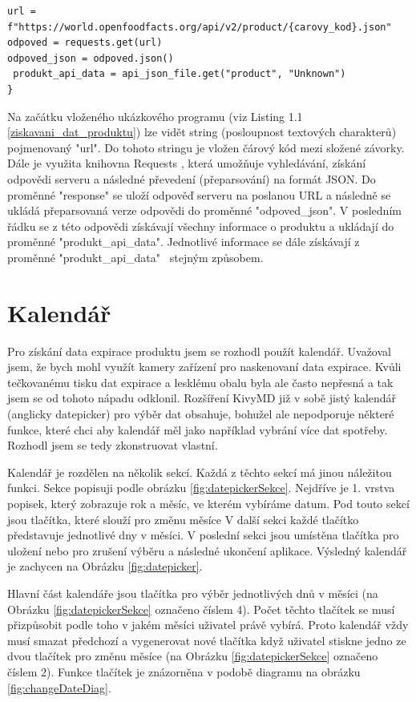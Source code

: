 \documentclass[12pt, a4paper, oneside]{report}
\begin{document}
\begin{lstlisting}[style=python,label=ziskavani_dat_produktu,caption=Ukázka získání JSON souboru produktu]
url = f"https://world.openfoodfacts.org/api/v2/product/{carovy_kod}.json"
odpoved = requests.get(url)
odpoved_json = odpoved.json()
 produkt_api_data = api_json_file.get("product", "Unknown")
}
\end{lstlisting}
Na začátku vloženého ukázkového programu (viz Listing 1.1 \ref{ziskavani_dat_produktu}) lze vidět string (posloupnost textových charakterů) pojmenovaný "url". Do tohoto stringu je vložen čárový kód mezi složené závorky. Dále je využita knihovna Requests \cite{requests}, která umožňuje vyhledávání, získání odpovědi serveru a následné převedení (přeparsování) na formát JSON. Do proměnné "response" se uloží odpověď serveru na poslanou URL a následně se ukládá přeparsovaná verze odpovědi do proměnné "odpoved\_json". V posledním řádku se z této odpovědi získávají všechny informace o produktu a ukládají do proměnné "produkt\_api\_data". Jednotlivé informace se dále získávají z proměnné "produkt\_api\_data" ~stejným způsobem.

\section{Kalendář}
Pro získání data expirace produktu jsem se rozhodl použít kalendář. Uvažoval jsem, že bych mohl využít kamery zařízení pro naskenovaní data expirace. Kvůli tečkovanému tisku dat expirace a lesklému obalu byla ale často nepřesná a tak jsem se od tohoto nápadu odklonil. Rozšíření KivyMD \cite{kivymd} již v sobě jistý kalendář (anglicky datepicker) pro výběr dat obsahuje, bohužel ale nepodporuje některé funkce, které chci aby kalendář měl jako například vybrání více dat spotřeby. Rozhodl jsem se tedy zkonstruovat vlastní.

Kalendář je rozdělen na několik sekcí. Každá z těchto sekcí má jinou náležitou funkci. Sekce popisuji podle obrázku \ref{fig:datepickerSekce}. Nejdříve je 1. vrstva  popisek, který zobrazuje rok a měsíc, ve kterém vybíráme datum. Pod touto sekcí jsou tlačítka, které slouží pro změnu měsíce V další sekci každé tlačítko představuje jednotlivé dny v měsíci. V poslední sekci jsou umístěna tlačítka pro uložení nebo pro zrušení výběru a následné ukončení aplikace. Výsledný kalendář je zachycen na Obrázku \ref{fig:datepicker}.

Hlavní část kalendáře jsou tlačítka pro výběr jednotlivých dnů v měsíci (na Obrázku \ref{fig:datepickerSekce} označeno číslem 4). Počet těchto tlačítek se musí přizpůsobit podle toho v jakém měsíci uživatel právě vybírá. Proto kalendář vždy musí smazat předchozí a vygenerovat nové tlačítka když uživatel stiskne jedno ze dvou tlačítek pro změnu měsíce (na Obrázku \ref{fig:datepickerSekce} označeno číslem 2). Funkce tlačítek je znázorněna v podobě diagramu na obrázku \ref{fig:changeDateDiag}.
\end{document}
